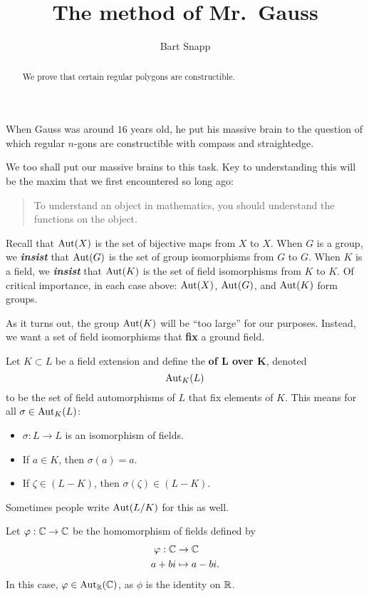 \documentclass{ximera}
\title{The method of Mr.\ Gauss}
\author{Bart Snapp}
\begin{document}
\begin{abstract}
  We prove that certain regular polygons are constructible.
\end{abstract}
\maketitle

When Gauss was around $16$ years old, he put his massive brain to the
question of which regular $n$-gons are constructible with compass and
straightedge.


We too shall put our massive brains to this task. Key to understanding
this will be the maxim that we first encountered so long ago:
\begin{quote}
  To understand an object in mathematics, you should understand the
  functions on the object.
\end{quote}
Recall that $\operatorname{Aut}(X)$ is the set of bijective maps
from $X$ to $X$. When $G$ is a group, we \textit{\bfseries insist}
that $\operatorname{Aut}(G)$ is the set of group isomorphisms from $G$ to $G$. When
$K$ is a field, we \textit{\textbf{insist}} that $\operatorname{Aut}(K)$ is the set
of field isomorphisms from $K$ to $K$. Of critical importance, in each
case above: $\operatorname{Aut}(X)$, $\operatorname{Aut}(G)$, and $\operatorname{Aut}(K)$ form groups.



As it turns out, the group $\operatorname{Aut}(K)$ will be ``too large'' for our
purposes. Instead, we want a set of field isomorphisms that
\textbf{fix} a ground field.


\begin{definition}
  Let $K\subset L$ be a field extension and define the
  \textbf{ of $\boldsymbol L$ over
    $\boldsymbol K$}, denoted
  \[
  \aut_K(L)\index{autKL@$\aut_K(L)$}
  \]
  to be the set of field automorphisms of $L$ that fix elements of
  $K$. This means for all $\sigma \in \operatorname{Aut}_K(L)$:
  \begin{itemize}
  \item $\sigma: L\to L$ is an isomorphism of fields.
  \item If $a\in K$, then $\sigma(a) = a$.
  \item If $\zeta\in (L - K)$, then $\sigma(\zeta) \in (L-K)$.
  \end{itemize}
  Sometimes people write $\operatorname{Aut}(L/K)$ for
  this as well.
\end{definition}

\begin{example}
  Let $\varphi:\mathbb C\to\mathbb C$ be the homomorphism of fields defined by
  \begin{align*}
    \varphi : \mathbb C &\to \mathbb C\\
    a+bi &\mapsto a - bi.
  \end{align*}
  In this case, $\varphi \in \operatorname{Aut}_\mathbb R(\mathbb C)$, as $\phi$ is the identity on
  $\mathbb R$.
\end{example}
\end{document}
